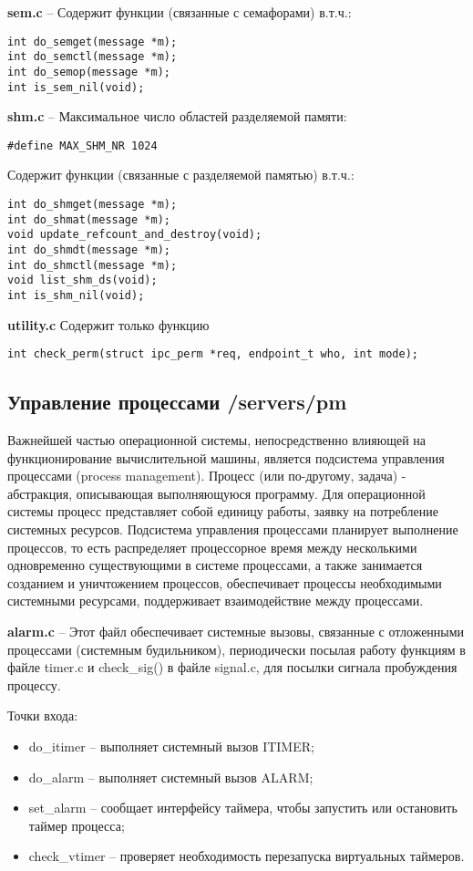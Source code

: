\textbf{sem.c} -- Содержит функции (связанные с семафорами) в.т.ч.:
\begin{Verbatim}[frame=single]
int do_semget(message *m);
int do_semctl(message *m);
int do_semop(message *m);
int is_sem_nil(void);
\end{Verbatim}

\textbf{shm.c} -- Максимальное число областей разделяемой памяти:
\begin{Verbatim}[frame=single]
#define MAX_SHM_NR 1024
\end{Verbatim}

Содержит функции (связанные с разделяемой памятью) в.т.ч.:
\begin{Verbatim}[frame=single]
int do_shmget(message *m);
int do_shmat(message *m);
void update_refcount_and_destroy(void);
int do_shmdt(message *m);
int do_shmctl(message *m);
void list_shm_ds(void);
int is_shm_nil(void);
\end{Verbatim}

\textbf{utility.c}
Содержит только функцию
\begin{Verbatim}[frame=single]
int check_perm(struct ipc_perm *req, endpoint_t who, int mode);
\end{Verbatim}

\subsection{Управление процессами /servers/pm}

Важнейшей частью операционной системы, непосредственно влияющей на функционирование вычислительной машины, является подсистема управления процессами (process management). Процесс (или по-другому, задача) - абстракция, описывающая выполняющуюся программу. Для операционной системы процесс представляет собой единицу работы, заявку на потребление системных ресурсов. Подсистема управления процессами планирует выполнение процессов, то есть распределяет процессорное время между несколькими одновременно существующими в системе процессами, а также занимается созданием и уничтожением процессов, обеспечивает процессы необходимыми системными ресурсами, поддерживает взаимодействие между процессами.

\textbf{alarm.c} -- Этот файл обеспечивает системные вызовы, связанные с отложенными процессами (системным будильником), периодически посылая работу функциям в файле timer.c и check\_sig() в файле signal.c, для посылки сигнала пробуждения процессу.

Точки входа:
\begin{itemize}
\item do\_itimer -- выполняет системный вызов ITIMER;
\item do\_alarm -- выполняет системный вызов ALARM;
\item set\_alarm -- сообщает интерфейсу таймера, чтобы запустить или остановить таймер процесса;
\item check\_vtimer -- проверяет необходимость перезапуска виртуальных таймеров.
\end{itemize}


